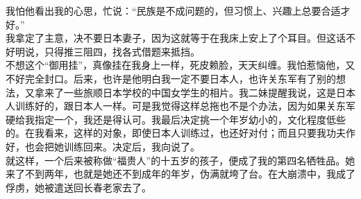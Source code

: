 我怕他看出我的心思，忙说：“民族是不成问题的，但习惯上、兴趣上总要合适才好。”\\

我拿定了主意，决不要日本妻子，因为这就等于在我床上安上了个耳目。但这话不好明说，只得推三阻四，找各式借题来抵挡。\\

不想这个“御用挂”，真像挂在我身上一样，死皮赖脸，天天纠缠。我怕惹恼他，又不好完全封口。后来，也许是他明白我一定不要日本人，也许关东军有了别的想法，又拿来了一些旅顺日本学校的中国女学生的相片。我二妹提醒我说，这是日本人训练好的，跟日本人一样。可是我觉得这样总拖也不是个办法，因为如果关东军硬给我指定一个，我还是得认可。我最后决定挑一个年岁幼小的，文化程度低些的。在我看来，这样的对象，即使日本人训练过，也还好对付；而且只要我功夫作好，也会把她训练回来。决定后，我向说了。\\

就这样，一个后来被称做“福贵人”的十五岁的孩子，便成了我的第四名牺牲品。她来了不到两年，也就是她还不到成年的年岁，伪满就垮了台。在大崩溃中，我成了俘虏，她被遣送回长春老家去了。